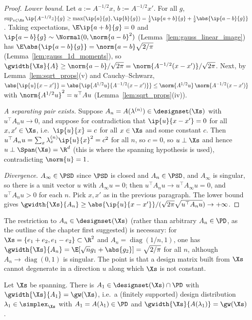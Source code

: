\begin{proof}
\emph{Lower bound.} Let $a := A^{-1/2}x$, $b := A^{-1/2}x'$. For all $g$,
$\sup_{z\in\Xs}\ip{A^{-1/2}z}{g} \ge \max(\ip{a}{g},\ip{b}{g}) = \tfrac12\ip{a+b}{g} +
\tfrac12\abs{\ip{a-b}{g}}$. Taking expectations, $\E\ip{a+b}{g} = 0$ and $\ip{a-b}{g} \sim
\Normal(0,\norm{a-b}^2)$ (Lemma~\ref{lem:gauss_linear_image}) has $\E\abs{\ip{a-b}{g}} =
\norm{a-b}\sqrt{2/\pi}$ (Lemma~\ref{lem:gauss_1d_moments}), so $\gwidth{\Xs}{A} \ge
\norm{a-b}/\sqrt{2\pi} = \norm{A^{-1/2}(x-x')}/\sqrt{2\pi}$. Next, by
Lemma~\ref{lem:sqrt_props}(v) and Cauchy--Schwarz,
$\abs{\ip{u}{x-x'}} = \abs{\ip{A^{1/2}u}{A^{-1/2}(x-x')}} \le \norm{A^{1/2}u}\,\norm{A^{-1/2}(x-x')}$
with $\norm{A^{1/2}u}^2 = u^\top A u$ (Lemma~\ref{lem:sqrt_props}(iv)).

\emph{A separating pair exists.} Suppose $A_n = A(\lambda^{(n)}) \in \designset(\Xs)$ with
$u^\top A_n u \to 0$, and suppose for contradiction that $\ip{u}{x - x'} = 0$ for all
$x, x' \in \Xs$, i.e.\ $\ip{u}{x} = c$ for all $x \in \Xs$ and some constant $c$. Then
$u^\top A_nu = \sum_x\lambda^{(n)}_x\ip{u}{x}^2 = c^2$ for all $n$, so $c = 0$, so $u \perp \Xs$
and hence $u \perp \Span(\Xs) = \R^d$ (this is where the spanning hypothesis is used),
contradicting $\norm{u} = 1$.

\emph{Divergence.} $A_\infty \in \PSD$ since $\PSD$ is closed and $A_n \in \PSD$, and $A_\infty$
is singular, so there is a unit vector $u$ with $A_\infty u = 0$; then $u^\top A_nu \to
u^\top A_\infty u = 0$, and $u^\top A_n u > 0$ for each $n$. Pick $x, x'$ as in the previous
paragraph. The lower bound gives $\gwidth{\Xs}{A_n} \ge \abs{\ip{u}{x-x'}}/(\sqrt{2\pi}\sqrt{u^\top A_nu})
\to +\infty$.
\end{proof}

\begin{remark}
The restriction to $A_n \in \designset(\Xs)$ (rather than arbitrary $A_n \in \PD$, as the
outline of the chapter first suggested) is necessary: for $\Xs = \{e_1 + e_2, e_1 - e_2\}
\subset \R^2$ and $A_n = \operatorname{diag}(1/n, 1)$, one has $\gwidth{\Xs}{A_n} =
\E[\sqrt n g_1 + \abs{g_2}] = \sqrt{2/\pi}$ for all $n$, although $A_n \to \operatorname{diag}(0,1)$
is singular. The point is that a design matrix built from $\Xs$ cannot degenerate in a direction
$u$ along which $\Xs$ is not constant.
\end{remark}

\begin{lemma}\label{lem:width_attained}
Let $\Xs$ be spanning. There is $A_1 \in \designset(\Xs)\cap\PD$ with $\gwidth{\Xs}{A_1} = \gw(\Xs)$,
i.e.\ a (finitely supported) design distribution $\lambda_1 \in \simplex_{\Xs}$ with
$A_1 = A(\lambda_1) \in \PD$ and $\gwidth{\Xs}{A(\lambda_1)} = \gw(\Xs)$.
\end{lemma}

